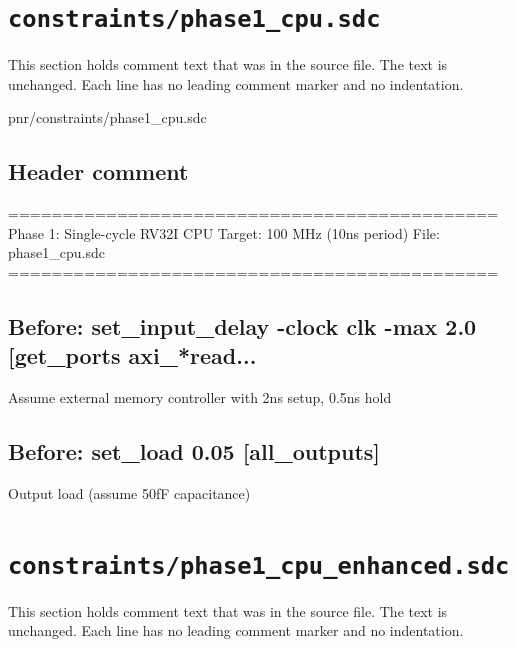 \section{\texttt{constraints/phase1\_cpu.sdc}}\label{tm:pd:phase1-cpu-sdc}

This section holds comment text that was in the source file. The text is unchanged. Each line has no leading comment marker and no indentation.

\begin{relocated}{pnr/constraints/phase1_cpu.sdc}

\subsection*{Header comment}

\begin{textblock}
=============================================
Phase 1: Single-cycle RV32I CPU
Target: 100 MHz (10ns period)
File: phase1_cpu.sdc
=============================================
\end{textblock}

\subsection*{Before: set\_input\_delay -clock clk -max 2.0 [get\_ports axi\_*read...}

\begin{textblock}
Assume external memory controller with 2ns setup, 0.5ns hold
\end{textblock}

\subsection*{Before: set\_load 0.05 [all\_outputs]}

\begin{textblock}
Output load (assume 50fF capacitance)
\end{textblock}

\end{relocated}

\section{\texttt{constraints/phase1\_cpu\_enhanced.sdc}}\label{tm:pd:phase1-cpu-enhanced-sdc}

This section holds comment text that was in the source file. The text is unchanged. Each line has no leading comment marker and no indentation.

